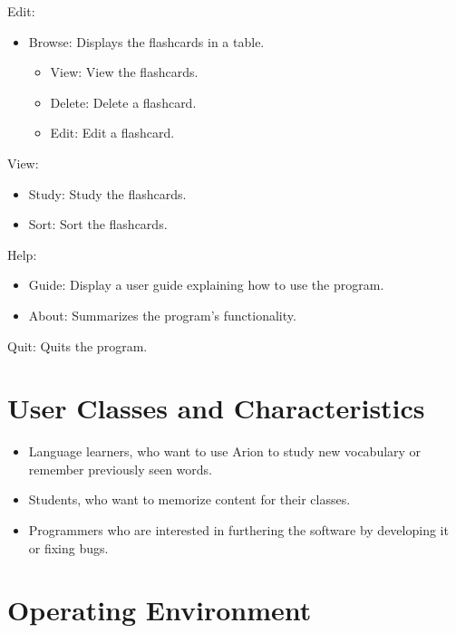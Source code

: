 \documentclass{scrreprt}
\begin{document}
Edit:
\begin{itemize}
    \item Browse: Displays the flashcards in a table.
    \begin{itemize}
        \item View: View the flashcards.
        \item Delete: Delete a flashcard.
        \item Edit: Edit a flashcard.
    \end{itemize}
\end{itemize}

View:
\begin{itemize}
    \item Study: Study the flashcards.
    \item Sort: Sort the flashcards.
\end{itemize}

Help:
\begin{itemize}
    \item Guide: Display a user guide explaining how to use the program.
    \item About: Summarizes the program's functionality.
\end{itemize}

Quit: Quits the program.

\section{User Classes and Characteristics}
\begin{itemize}
    \item Language learners, who want to use Arion to study new vocabulary or remember previously seen words.
    \item Students, who want to memorize content for their classes.
    \item Programmers who are interested in furthering the software by developing it or fixing bugs.
\end{itemize}

\section{Operating Environment}
\end{document}
